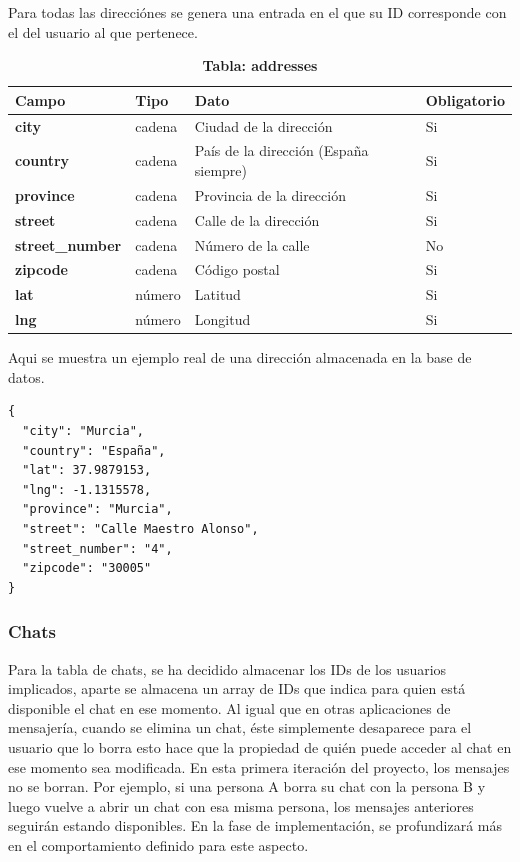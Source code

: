 \documentclass[a4paper, 12pt]{article}
\begin{document}
Para todas las direcciónes se genera una entrada en el que su ID corresponde con el del usuario al que pertenece.

\begin{table}[H]
\captionsetup{justification=raggedright,singlelinecheck=false}
\caption{\textbf{Tabla: addresses}}
\label{tab:Addresses}
	\begin{tabular}{|m{3cm}|m{2cm}|m{5cm}|m{3cm}|}
	\hline
	\textbf{Campo} & \textbf{Tipo} & \textbf{Dato} & \textbf{Obligatorio} \\ 
	\hline
	\textbf{city} & cadena & Ciudad de la dirección & Si \\ 
	\hline
	\textbf{country} & cadena & País de la dirección (España siempre) & Si\\ 
	\hline
	\textbf{province} &  cadena & Provincia de la dirección & Si \\ 
	\hline
	\textbf{street} &  cadena & Calle de la dirección & Si \\ 
	\hline
	\textbf{street\_number} &  cadena & Número de la calle & No\\ 
	\hline
	\textbf{zipcode} & cadena & Código postal & Si \\ 
	\hline
	\textbf{lat} & número & Latitud & Si \\ 
	\hline
	\textbf{lng} & número & Longitud & Si \\ 
	\hline
\end{tabular}
\end{table}

Aqui se muestra un ejemplo real de una dirección almacenada en la base de datos.

\begin{verbatim}
{
  "city": "Murcia",
  "country": "España",
  "lat": 37.9879153,
  "lng": -1.1315578,
  "province": "Murcia",
  "street": "Calle Maestro Alonso",
  "street_number": "4",
  "zipcode": "30005"
}
\end{verbatim}

\subsubsection{Chats}

Para la tabla de chats, se ha decidido almacenar los IDs de los usuarios implicados, aparte se almacena un array de IDs que indica para quien está disponible el chat en ese momento. Al igual que en otras aplicaciones de mensajería, cuando se elimina un chat, éste simplemente desaparece para el usuario que lo borra esto hace que la propiedad de quién puede acceder al chat en ese momento sea modificada. En esta primera iteración del proyecto, los mensajes no se borran. Por ejemplo, si una persona A borra su chat con la persona B y luego vuelve a abrir un chat con esa misma persona, los mensajes anteriores seguirán estando disponibles. En la fase de implementación, se profundizará más en el comportamiento definido para este aspecto.
\end{document}
